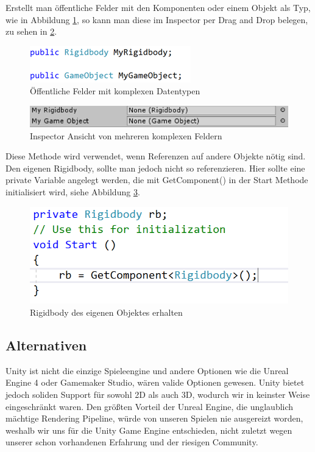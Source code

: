 Erstellt man öffentliche Felder mit den Komponenten oder einem Objekt als Typ, wie in Abbildung \ref{img:unity-puplicfield}, so kann man diese im Inspector per Drag and Drop belegen, zu sehen in \ref{img:unity-inspectoradvanced}.
\begin{figure}
    \includegraphics[scale=0.8]{images/unityPuplicField.png}
    \caption{Öffentliche Felder mit komplexen Datentypen}
    \label{img:unity-puplicfield}
\end{figure}
\begin{figure}
    \includegraphics[scale=0.8]{images/unityInspectorAdvanced.png}
    \caption{Inspector Ansicht von mehreren komplexen Feldern}
    \label{img:unity-inspectoradvanced}
\end{figure}

Diese Methode wird verwendet, wenn Referenzen auf andere Objekte nötig sind. Den eigenen Rigidbody, sollte man jedoch nicht so referenzieren. Hier sollte eine private Variable angelegt werden, die mit GetComponent() in der Start Methode initialisiert wird, siehe Abbildung \ref{img:unity-getcomponent}.
\begin{figure}
    \includegraphics[scale=0.8]{images/unityGetComponent.png}
    \caption{Rigidbody des eigenen Objektes erhalten}
    \label{img:unity-getcomponent}
\end{figure}
\subsection{Alternativen}
Unity ist nicht die einzige Spieleengine und andere Optionen wie die Unreal Engine 4 oder Gamemaker Studio, wären valide Optionen gewesen. Unity bietet jedoch soliden Support für sowohl 2D als auch 3D, wodurch wir in keinster Weise eingeschränkt waren.  Den größten Vorteil der Unreal Engine, die unglaublich mächtige Rendering Pipeline, würde von unseren Spielen nie ausgereizt worden, weshalb wir uns für die Unity Game Engine entschieden, nicht zuletzt wegen unserer schon vorhandenen Erfahrung und der riesigen Community.